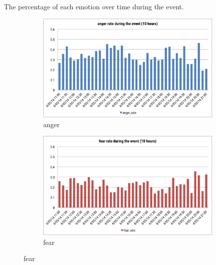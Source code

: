 The percentage of each emotion over time during the event.
\clearpage
\begin{figure}[htb!] 
\centering    
\begin{subfigure}{0.5\textwidth}
\centering
\includegraphics[width=0.98\linewidth]{AngerRateEvent}
\caption{anger}
\label{fig:angerRateEvent}
\end{subfigure}%
\begin{subfigure}{0.5\textwidth}
\centering    
\includegraphics[width=0.98\linewidth]{FearRateEvent}
\caption{fear}
\label{fig:fearRateEvent}
\end{subfigure}


\end{figure}
